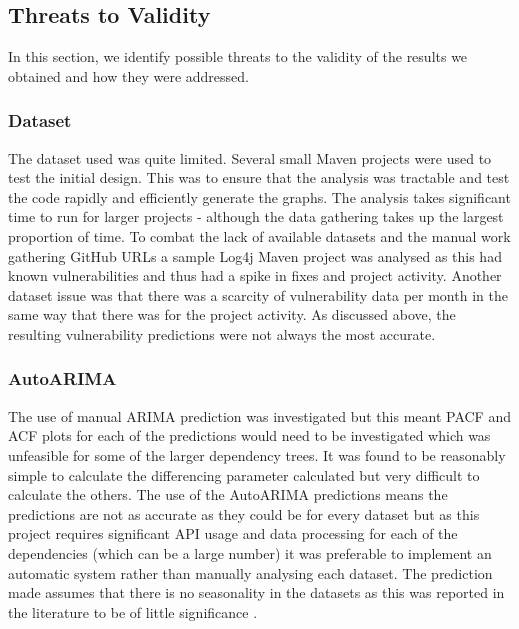 \documentclass[conference]{IEEEtran}
\begin{document}
\subsection{Threats to Validity}
In this section, we identify possible threats to the validity of the results we obtained and how they were addressed. 

\subsubsection{Dataset}
The dataset used was quite limited. Several small Maven projects were used to test the initial design. This was to ensure that the analysis was tractable and test the code rapidly and efficiently generate the graphs. The analysis takes significant time to run for larger projects - although the data gathering takes up the largest proportion of time. To combat the lack of available datasets and the manual work gathering GitHub URLs a sample Log4j Maven project was analysed as this had known vulnerabilities and thus had a spike in fixes and project activity. Another dataset issue was that there was a scarcity of vulnerability data per month in the same way that there was for the project activity. As discussed above, the resulting vulnerability predictions were not always the most accurate. 

\subsubsection{AutoARIMA}
The use of manual ARIMA prediction was investigated but this meant PACF and ACF plots for each of the predictions would need to be investigated which was unfeasible for some of the larger dependency trees. It was found to be reasonably simple to calculate the differencing parameter calculated but very difficult to calculate the others. The use of the AutoARIMA predictions means the predictions are not as accurate as they could be for every dataset but as this project requires significant API usage and data processing for each of the dependencies (which can be a large number) it was preferable to implement an automatic system rather than manually analysing each dataset. The prediction made assumes that there is no seasonality in the datasets as this was reported in the literature to be of little significance \cite{roumani_time_2015}. 
\end{document}
